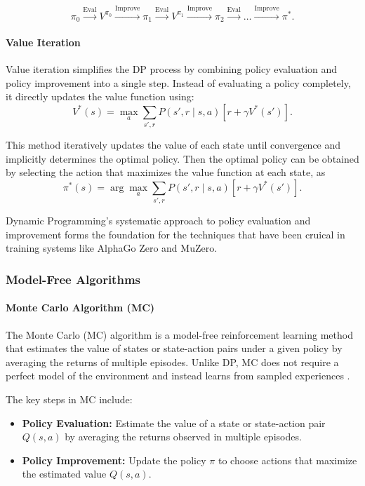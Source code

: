 \[
    \pi_0 \xrightarrow{\text{Eval}} V^{\pi_0} \xrightarrow{\text{Improve}} \pi_1 \xrightarrow{\text{Eval}} V^{\pi_1} \xrightarrow{\text{Improve}} \pi_2 \xrightarrow{\text{Eval}} \ldots \xrightarrow{\text{Improve}} \pi^*.
\]

\paragraph{Value Iteration}
Value iteration simplifies the DP process by combining policy evaluation and
policy improvement into a single step. Instead of evaluating a policy
completely, it directly updates the value function using:
\begin{equation}
    V^*(s) = \max_a \sum_{s', r} P(s', r \mid s, a) \left[ r + \gamma V^*(s') \right].
\end{equation}

This method iteratively updates the value of each state until convergence and
implicitly determines the optimal policy. Then the optimal policy can be
obtained by selecting the action that maximizes the value function at each
state, as
\begin{equation}
    \pi^*(s) = \arg\max_a \sum_{s', r} P(s', r \mid s, a) \left[ r + \gamma V^*(s') \right].
\end{equation}

Dynamic Programming's systematic approach to policy evaluation and improvement
forms the foundation for the techniques that have been cruical in training
systems like AlphaGo Zero and MuZero\cite{bg2}.

\subsubsection{\textbf{Model-Free Algorithms}}

\paragraph{Monte Carlo Algorithm (MC)}
The Monte Carlo (MC) algorithm is a model-free reinforcement learning method
that estimates the value of states or state-action pairs under a given policy
by averaging the returns of multiple episodes. Unlike DP, MC does not require a
perfect model of the environment and instead learns from sampled experiences \cite{bg2}.

The key steps in MC include:

\begin{itemize}
    \item \textbf{Policy Evaluation:} Estimate the value of a state or state-action pair \( Q(s, a) \) by averaging the returns observed in multiple episodes.
    \item \textbf{Policy Improvement:} Update the policy \( \pi \) to choose actions that maximize the estimated value \( Q(s, a) \).
\end{itemize}

